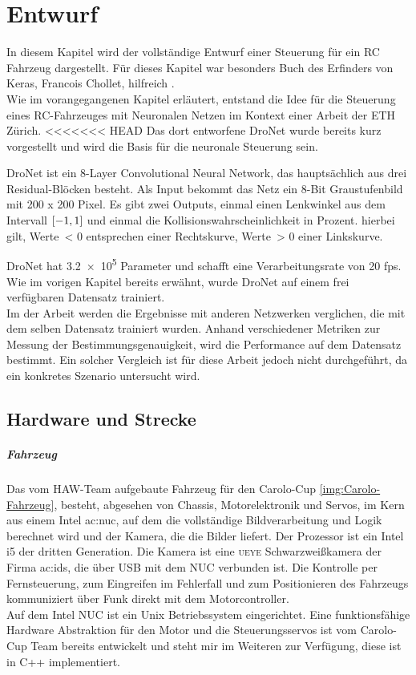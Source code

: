 %
\chapter{Entwurf}
In diesem Kapitel wird der vollständige Entwurf einer Steuerung für ein RC Fahrzeug dargestellt.
Für dieses Kapitel war besonders Buch des Erfinders von Keras, Francois Chollet, hilfreich \cite{chollet2018deep}.\\

Wie im vorangegangenen Kapitel erläutert, entstand die Idee für die Steuerung eines RC-Fahrzeuges mit Neuronalen Netzen im Kontext einer Arbeit der ETH Zürich.
<<<<<<< HEAD
Das dort entworfene DroNet wurde bereits kurz vorgestellt und wird die Basis für die neuronale Steuerung sein. 

DroNet ist ein 8-Layer Convolutional Neural Network, das hauptsächlich aus drei Residual-Blöcken besteht. Als Input bekommt das Netz ein 8-Bit Graustufenbild mit 200 x 200 Pixel. Es gibt zwei Outputs, einmal einen Lenkwinkel aus dem Intervall $\interval{-1}{1}$ und einmal die Kollisionswahrscheinlichkeit in Prozent. hierbei gilt, Werte~< 0 entsprechen einer Rechtskurve, Werte~> 0 einer Linkskurve.

DroNet hat \num{3.2e5} Parameter und schafft eine Verarbeitungsrate von 20 fps.
Wie im vorigen Kapitel bereits erwähnt, wurde DroNet auf einem frei verfügbaren Datensatz trainiert.\\
Im der Arbeit werden die Ergebnisse mit anderen Netzwerken verglichen, die mit dem selben Datensatz trainiert wurden. Anhand verschiedener Metriken zur Messung der Bestimmungsgenauigkeit, wird die Performance auf dem Datensatz bestimmt. Ein solcher Vergleich ist für diese Arbeit jedoch nicht durchgeführt, da ein konkretes Szenario untersucht wird.
\newpage 

\section{Hardware und Strecke}
\paragraph{Fahrzeug}
Das vom HAW-Team aufgebaute Fahrzeug für den Carolo-Cup \ref{img:Carolo-Fahrzeug}, besteht, abgesehen von Chassis, Motorelektronik und Servos, im Kern aus einem Intel \gls{ac:nuc}, auf dem die vollständige Bildverarbeitung und Logik berechnet wird und der Kamera, die die Bilder liefert. Der Prozessor ist ein Intel i5 der dritten Generation. Die Kamera ist eine \textsc{ueye} Schwarzweißkamera der Firma \gls{ac:ids}, die über USB mit dem NUC verbunden ist. 
Die Kontrolle per Fernsteuerung, zum Eingreifen im Fehlerfall und zum Positionieren des Fahrzeugs kommuniziert über Funk direkt mit dem Motorcontroller.\\
Auf dem Intel NUC ist ein Unix Betriebssystem eingerichtet.
Eine funktionsfähige Hardware Abstraktion für den Motor und die Steuerungsservos ist vom Carolo-Cup Team bereits entwickelt und steht mir im Weiteren zur Verfügung, diese ist in C++ implementiert.

